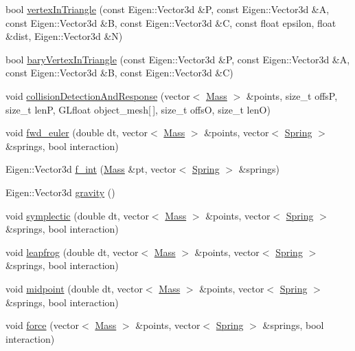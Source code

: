 \begin{DoxyCompactItemize}
\item 
bool \hyperlink{namespacestd_a8f17d2dea5f0758f77d130979a6ce6bf}{vertex\+In\+Triangle} (const Eigen\+::\+Vector3d \&P, const Eigen\+::\+Vector3d \&A, const Eigen\+::\+Vector3d \&B, const Eigen\+::\+Vector3d \&C, const float epsilon, float \&dist, Eigen\+::\+Vector3d \&N)
\item 
bool \hyperlink{namespacestd_a41fa9cfdd951bf0cc7f23973beaa7fdb}{bary\+Vertex\+In\+Triangle} (const Eigen\+::\+Vector3d \&P, const Eigen\+::\+Vector3d \&A, const Eigen\+::\+Vector3d \&B, const Eigen\+::\+Vector3d \&C)
\item 
void \hyperlink{namespacestd_a21cb14ca4c41a856be94b8fc9ff59c5a}{collision\+Detection\+And\+Response} (vector$<$ \hyperlink{classMass}{Mass} $>$ \&points, size\+\_\+t offs\+P, size\+\_\+t len\+P, G\+Lfloat object\+\_\+mesh\mbox{[}$\,$\mbox{]}, size\+\_\+t offs\+O, size\+\_\+t len\+O)
\item 
void \hyperlink{namespacestd_a799147cff61c9c79a5ef80489d410fe2}{fwd\+\_\+euler} (double dt, vector$<$ \hyperlink{classMass}{Mass} $>$ \&points, vector$<$ \hyperlink{classSpring}{Spring} $>$ \&springs, bool interaction)
\item 
Eigen\+::\+Vector3d \hyperlink{namespacestd_a531c113b5d68b2af865bcc27ae4c8cc4}{f\+\_\+int} (\hyperlink{classMass}{Mass} \&pt, vector$<$ \hyperlink{classSpring}{Spring} $>$ \&springs)
\item 
Eigen\+::\+Vector3d \hyperlink{namespacestd_a4b332ac1eb524b67a49cfc0187f70b75}{gravity} ()
\item 
void \hyperlink{namespacestd_af9b93750ea7aaecab7885d024fd822a2}{symplectic} (double dt, vector$<$ \hyperlink{classMass}{Mass} $>$ \&points, vector$<$ \hyperlink{classSpring}{Spring} $>$ \&springs, bool interaction)
\item 
void \hyperlink{namespacestd_a6a2a5c73fecc45374baf25b7b05dbc97}{leapfrog} (double dt, vector$<$ \hyperlink{classMass}{Mass} $>$ \&points, vector$<$ \hyperlink{classSpring}{Spring} $>$ \&springs, bool interaction)
\item 
void \hyperlink{namespacestd_ae925c3874f2dd2ec669c4640831d17b6}{midpoint} (double dt, vector$<$ \hyperlink{classMass}{Mass} $>$ \&points, vector$<$ \hyperlink{classSpring}{Spring} $>$ \&springs, bool interaction)
\item 
void \hyperlink{namespacestd_a8bde1e030dd347ced2d32f063f983420}{force} (vector$<$ \hyperlink{classMass}{Mass} $>$ \&points, vector$<$ \hyperlink{classSpring}{Spring} $>$ \&springs, bool interaction)
\end{DoxyCompactItemize}

